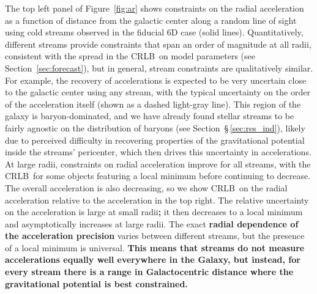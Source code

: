 \documentclass[modern]{aastex62}
\newcommand{\acronym}[1]{{\small{#1}}}
\newcommand{\CRLB}{\acronym{CRLB}}
\begin{document}
The top left panel of Figure~\ref{fig:ar} shows constraints on the radial acceleration as a function of distance from the galactic center along a random line of sight using cold streams observed in the fiducial 6D case (solid lines).
Quantitatively, different streams provide constraints that span an order of magnitude at all radii, consistent with the spread in the \CRLB\ on model parameters (see Section~\ref{sec:forecast}), but in general, stream constraints are qualitatively similar.
For example, the recovery of accelerations is expected to be very uncertain close to the galactic center using any stream, with the typical uncertainty on the order of the acceleration itself (shown as a dashed light-gray line).
This region of the galaxy is baryon-dominated, and we have already found stellar streams to be fairly agnostic on the distribution of baryons (see Section~\S\,\ref{sec:res_ind}), likely due to perceived difficulty in recovering properties of the gravitational potential inside the streams' pericenter, which then drives this uncertainty in accelerations.
At large radii, constraints on radial acceleration improve for all streams, with the \CRLB\ for some objects featuring a local minimum before continuing to decrease.
The overall acceleration is also decreasing, so we show \CRLB\ on the radial acceleration relative to the acceleration in the top right.
The relative uncertainty on the acceleration is large at small radii{\bf ;} it then decreases to a local minimum and asymptotically increases at large radii.
The exact {\bf radial dependence of the acceleration precision} varies between different streams, but the presence of a local minimum is universal.
{\bf This means that streams do not measure accelerations equally well everywhere in the Galaxy, but instead, for every stream there is a range in Galactocentric distance where the gravitational potential is best constrained.}
\end{document}
